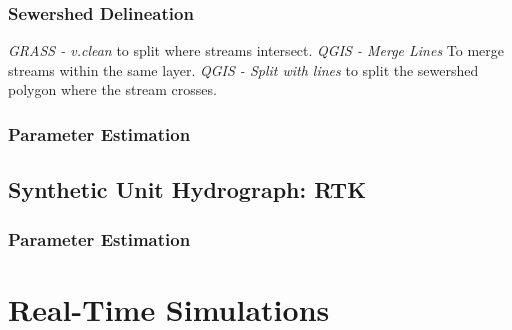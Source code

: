         \subsubsection{Sewershed Delineation}
          
         \textit{GRASS - v.clean} to split where streams intersect.
         \textit{QGIS - Merge Lines} To merge streams within the same layer. 
         \textit{QGIS - Split with lines} to split the sewershed polygon where the stream crosses.
        
        
        \subsubsection{Parameter Estimation}
    
    \subsection{Synthetic Unit Hydrograph: RTK}
        
        \subsubsection{Parameter Estimation}
        
\section{Real-Time Simulations}